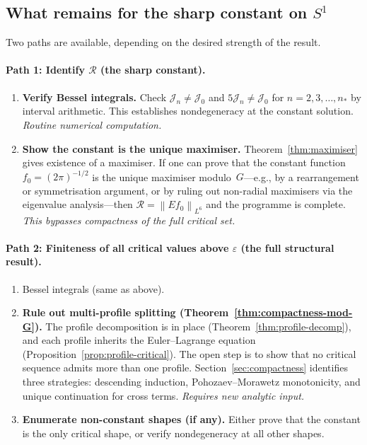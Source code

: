 \documentclass[12pt]{article}
\theoremstyle{definition}
\theoremstyle{remark}
\newcommand{\norm}[1]{\left\|#1\right\|}
\begin{document}
\subsection{What remains for the sharp constant on $S^1$}

Two paths are available, depending on the desired strength of the result.

\paragraph{Path 1: Identify $\mathcal R$ (the sharp constant).}
\begin{enumerate}[leftmargin=2em]
  \item \textbf{Verify Bessel integrals.}  Check
    $\mathcal J_n\neq\mathcal J_0$ and $5\mathcal J_n\neq\mathcal J_0$
    for $n=2,3,\ldots,n_*$ by interval arithmetic.  This establishes
    nondegeneracy at the constant solution.  \emph{Routine numerical
    computation.}

  \item \textbf{Show the constant is the unique maximiser.}
    Theorem~\ref{thm:maximiser} gives existence of a maximiser.
    If one can prove that the constant function $f_0=(2\pi)^{-1/2}$
    is the unique maximiser modulo~$G$---e.g., by a rearrangement
    or symmetrisation argument, or by ruling out non-radial
    maximisers via the eigenvalue analysis---then
    $\mathcal R=\norm{Ef_0}_{L^6}$ and the programme is complete.
    \emph{This bypasses compactness of the full critical set.}
\end{enumerate}

\paragraph{Path 2: Finiteness of all critical values above
$\varepsilon$ (the full structural result).}
\begin{enumerate}[leftmargin=2em]
  \item Bessel integrals (same as above).

  \item \textbf{Rule out multi-profile splitting
    (Theorem~\ref{thm:compactness-mod-G}).}
    The profile decomposition is in place
    (Theorem~\ref{thm:profile-decomp}), and each profile inherits the
    Euler--Lagrange equation
    (Proposition~\ref{prop:profile-critical}).  The open step is to
    show that no critical sequence admits more than one profile.
    Section~\ref{sec:compactness} identifies three strategies:
    descending induction, Pohozaev--Morawetz monotonicity, and unique
    continuation for cross terms.  \emph{Requires new analytic input.}

  \item \textbf{Enumerate non-constant shapes (if any).}  Either prove
    that the constant is the only critical shape, or verify
    nondegeneracy at all other shapes.
\end{enumerate}
\end{document}
